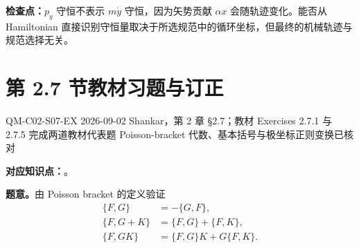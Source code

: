 \textbf{检查点：}$p_y$ 守恒不表示 $m\dot y$ 守恒，因为矢势贡献 $\alpha x$ 会随轨迹变化。能否从 Hamiltonian 直接识别守恒量取决于所选规范中的循环坐标，但最终的机械轨迹与规范选择无关。

\section{第 2.7 节教材习题与订正}
\label{exercise-set:QM-C02-S07}

\exercisemeta
  {QM-C02-S07-EX}
  {2026-09-02}
  {Shankar，第 2 章 \S 2.7；教材 Exercises 2.7.1 与 2.7.5}
  {完成两道教材代表题}
  {Poisson-bracket 代数、基本括号与极坐标正则变换已核对}


\textbf{对应知识点：}。

\textbf{题意。}由 Poisson bracket 的定义验证
\begin{align}
  \{F,G\}&=-\{G,F\},
  \label{eq:QM-C02-S07-E01-antisymmetry}\\
  \{F,G+K\}&=\{F,G\}+\{F,K\},
  \label{eq:QM-C02-S07-E01-additivity}\\
  \{F,GK\}&=\{F,G\}K+G\{F,K\}.
  \label{eq:QM-C02-S07-E01-product}
\end{align}

